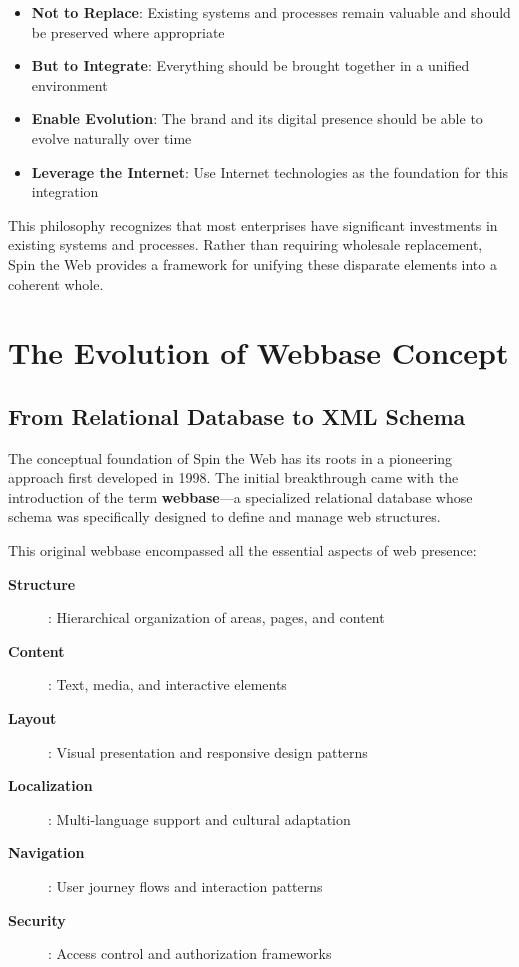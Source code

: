 \begin{itemize}
\item \textbf{Not to Replace}: Existing systems and processes remain valuable and should be preserved where appropriate
\item \textbf{But to Integrate}: Everything should be brought together in a unified environment
\item \textbf{Enable Evolution}: The brand and its digital presence should be able to evolve naturally over time
\item \textbf{Leverage the Internet}: Use Internet technologies as the foundation for this integration
\end{itemize}

This philosophy recognizes that most enterprises have significant investments in existing systems and processes. Rather than requiring wholesale replacement, Spin the Web provides a framework for unifying these disparate elements into a coherent whole.

\section{The Evolution of Webbase Concept}

\subsection{From Relational Database to XML Schema}

The conceptual foundation of Spin the Web has its roots in a pioneering approach first developed in 1998. The initial breakthrough came with the introduction of the term \textbf{webbase}—a specialized relational database whose schema was specifically designed to define and manage web structures.

This original webbase encompassed all the essential aspects of web presence:

\begin{description}
\item[\textbf{Structure}]: Hierarchical organization of areas, pages, and content
\item[\textbf{Content}]: Text, media, and interactive elements
\item[\textbf{Layout}]: Visual presentation and responsive design patterns
\item[\textbf{Localization}]: Multi-language support and cultural adaptation
\item[\textbf{Navigation}]: User journey flows and interaction patterns
\item[\textbf{Security}]: Access control and authorization frameworks
\end{description}

